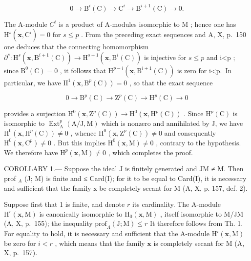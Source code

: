 \[
0 \rightarrow \mathrm{B} ^ {i} (\mathrm{C}) \rightarrow \mathrm{C} ^ {i} \rightarrow \mathrm{B} ^ {i + 1} (\mathrm{C}) \rightarrow 0.
\]

The A-module \(C^{i}\) is a product of A-modules isomorphic to M ; hence one has \(\mathrm{H}^{s}(\mathbf{x},\mathrm{C}^{i})=0\) for \(s\leqslant p\) . From the preceding exact sequences and A, X, p.~150 one deduces that the connecting homomorphism \(\partial^{s}:\mathrm{H}^{s}(\mathbf{x},\mathrm{B}^{i+1}(\mathrm{C}))\longrightarrow\mathrm{H}^{s+1}(\mathbf{x},\mathrm{B}^{i}(\mathrm{C}))\) is injective for \(s\leqslant p\) and i\textless p ; since \(\mathrm{B}^{0}(\mathrm{C})=0\) , it follows that \(\mathrm{H}^{p-i}(\mathbf{x},\mathrm{B}^{i+1}(\mathrm{C}))\) is zero for i\textless p.~In particular, we have \(\mathrm{II}^{1}(\mathbf{x},\mathrm{B}^{p}(\mathrm{C}))=0\) , so that the exact sequence

\[
0 \to \mathrm{B} ^ {p} (\mathrm{C}) \to \mathrm{Z} ^ {p} (\mathrm{C}) \to \mathrm{H} ^ {p} (\mathrm{C}) \to 0
\]

provides a surjection \(\mathrm{H}^{0}(\mathbf{x},\mathrm{Z}^{p}(\mathrm{C}))\longrightarrow\mathrm{H}^{0}(\mathbf{x},\mathrm{H}^{p}(\mathrm{C}))\) . Since \(\mathrm{H}^{p}(\mathrm{C})\) is isomorphic to \(\operatorname{Ext}_{\mathrm{A}}^{p}(\mathrm{A}/\mathrm{J},\mathrm{M})\) which is nonzero and annihilated by J, we have \(\mathrm{H}^{0}(\mathbf{x},\mathrm{H}^{p}(\mathrm{C}))\neq0\) , whence \(\mathrm{H}^{0}(\mathbf{x},\mathrm{Z}^{p}(\mathrm{C}))\neq0\) and consequently \(\mathrm{H}^{0}(\mathbf{x},\mathrm{C}^{p})\neq0\) . But this implies \(\mathrm{H}^{0}(\mathbf{x},\mathrm{M})\neq0\) , contrary to the hypothesis. We therefore have \(\mathrm{H}^{p}(\mathbf{x},\mathrm{M})\neq0\) , which completes the proof.

COROLLARY 1.--- Suppose the ideal J is finitely generated and JM ≠ M. Then prof \(_{A}\) (J; M) is finite and ≤ Card(I); for it to be equal to Card(I), it is necessary and sufficient that the family x be completely secant for M (A, X, p. 157, def. 2).

Suppose first that 1 is finite, and denote \(r\) its cardinality. The A-module \(\mathrm{H}^r (\mathbf{x},\mathrm{M})\) is canonically isomorphic to \(\mathrm{H}_0(\mathbf{x},\mathrm{M})\) , itself isomorphic to M/JM (A, X, p.~155); the inequality \(\mathrm{prof}_{\Lambda}(\mathrm{J};\mathrm{M})\leqslant r\) It therefore follows from Th. 1. For equality to hold, it is necessary and sufficient that the A-module \(\mathrm{H}^i (\mathbf{x},\mathrm{M})\) be zero for \(i < r\) , which means that the family \(\mathbf{x}\) is completely secant for M (A, X, p.~157).

